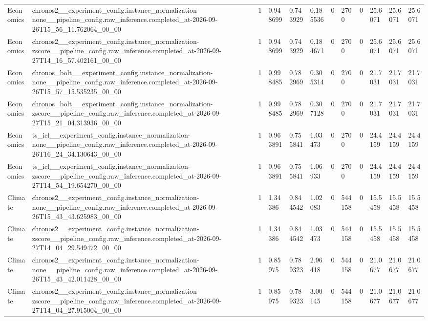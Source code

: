 \begin{tabular}{llllllllllll}
Economics & chronos2\_\_experiment\_config.instance\_normalization-none\_\_pipeline\_config.raw\_inference.completed\_at-2026-09-26T15\_56\_11.762064\_00\_00 & 1 & 0.948699 & 0.743929 & 0.185536 & 0 & 2700 & 0 & 25.6071 & 25.6071 & 25.6071 \\
Economics & chronos2\_\_experiment\_config.instance\_normalization-zscore\_\_pipeline\_config.raw\_inference.completed\_at-2026-09-27T14\_16\_57.402161\_00\_00 & 1 & 0.948699 & 0.743929 & 0.184671 & 0 & 2700 & 0 & 25.6071 & 25.6071 & 25.6071 \\
Economics & chronos\_bolt\_\_experiment\_config.instance\_normalization-none\_\_pipeline\_config.raw\_inference.completed\_at-2026-09-26T15\_57\_15.535235\_00\_00 & 1 & 0.998485 & 0.782969 & 0.305314 & 0 & 2700 & 0 & 21.7031 & 21.7031 & 21.7031 \\
Economics & chronos\_bolt\_\_experiment\_config.instance\_normalization-zscore\_\_pipeline\_config.raw\_inference.completed\_at-2026-09-27T15\_21\_04.313936\_00\_00 & 1 & 0.998485 & 0.782969 & 0.307128 & 0 & 2700 & 0 & 21.7031 & 21.7031 & 21.7031 \\
Economics & ts\_icl\_\_experiment\_config.instance\_normalization-none\_\_pipeline\_config.raw\_inference.completed\_at-2026-09-26T16\_24\_34.130643\_00\_00 & 1 & 0.963891 & 0.755841 & 1.03473 & 0 & 2700 & 0 & 24.4159 & 24.4159 & 24.4159 \\
Economics & ts\_icl\_\_experiment\_config.instance\_normalization-zscore\_\_pipeline\_config.raw\_inference.completed\_at-2026-09-27T14\_54\_19.654270\_00\_00 & 1 & 0.963891 & 0.755841 & 1.06933 & 0 & 2700 & 0 & 24.4159 & 24.4159 & 24.4159 \\
Climate & chronos2\_\_experiment\_config.instance\_normalization-none\_\_pipeline\_config.raw\_inference.completed\_at-2026-09-26T15\_43\_43.625983\_00\_00 & 1 & 1.34386 & 0.844542 & 1.02083 & 0 & 544158 & 0 & 15.5458 & 15.5458 & 15.5458 \\
Climate & chronos2\_\_experiment\_config.instance\_normalization-zscore\_\_pipeline\_config.raw\_inference.completed\_at-2026-09-27T14\_04\_29.549472\_00\_00 & 1 & 1.34386 & 0.844542 & 1.03473 & 0 & 544158 & 0 & 15.5458 & 15.5458 & 15.5458 \\
Climate & chronos2\_\_experiment\_config.instance\_normalization-none\_\_pipeline\_config.raw\_inference.completed\_at-2026-09-26T15\_43\_42.011428\_00\_00 & 1 & 0.85975 & 0.789323 & 2.96418 & 0 & 544158 & 0 & 21.0677 & 21.0677 & 21.0677 \\
Climate & chronos2\_\_experiment\_config.instance\_normalization-zscore\_\_pipeline\_config.raw\_inference.completed\_at-2026-09-27T14\_04\_27.915004\_00\_00 & 1 & 0.85975 & 0.789323 & 3.00145 & 0 & 544158 & 0 & 21.0677 & 21.0677 & 21.0677 \\

\end{tabular}
